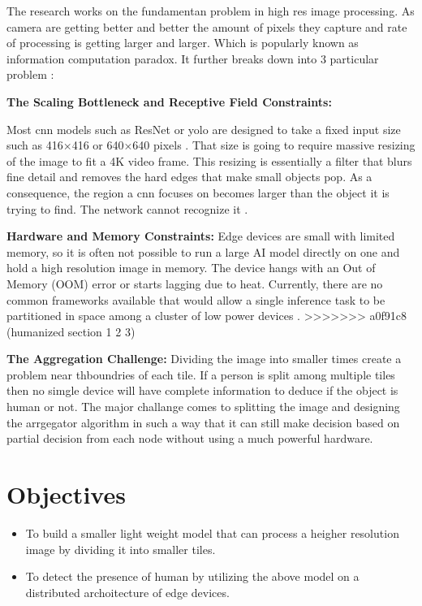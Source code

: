 The research works on the fundamentan problem in high res image processing. As camera are getting better and better the amount of pixels they capture and rate of processing is getting larger and larger. Which is popularly known as information computation paradox. It further breaks down into 3 particular problem : 

\textbf{The Scaling Bottleneck and Receptive Field Constraints:} 

Most \gls{cnn} models such as ResNet or \gls{yolo} are designed to take a fixed input size such as 416×416 or 640×640 pixels \cite{luo2016understanding} . That size is going to require massive resizing of the image to fit a 4K video frame. This resizing is essentially a filter that blurs fine detail and removes the hard edges that make small objects pop. As a consequence, the region a \gls{cnn} focuses on becomes larger than the object it is trying to find. The network cannot recognize it \cite{luo2016understanding}.


\textbf{Hardware and Memory Constraints:} Edge devices are small with limited memory, so it is often not possible to run a large AI model directly on one and hold a high resolution image in memory. The device hangs with an Out of Memory (OOM) error or starts lagging due to heat. Currently, there are no common frameworks available that would allow a single inference task to be partitioned in space among a cluster of low power devices \cite{hadidi2019distributed}.
>>>>>>> a0f91c8 (humanized section 1 2 3)

\textbf{The Aggregation Challenge:} Dividing the image into smaller times create a problem near thboundries of each tile. If a person is split among multiple tiles then no simgle device will have complete information to deduce if the object is human or not. The major challange comes to splitting the image and designing the arrgegator algorithm in such a way that it can still make decision based on partial decision from each node without using a much powerful hardware.  \cite{sahi2022_overlap}

\newpage
\section{Objectives}
\begin{itemize}
    \item To build a smaller light weight model that can process a heigher resolution image by dividing it into smaller tiles.
    \item To detect the presence of human by utilizing the above model on a distributed archoitecture of edge devices.
\end{itemize}

